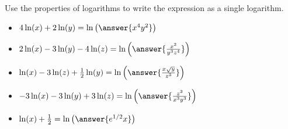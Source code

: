 \documentclass{ximera}
\author{Carl Stitz \and Jeff Zeager \and Bart Snapp \and Matthew Carr}
\begin{document}
\begin{exercise}
Use the properties of logarithms to write the expression as a single
logarithm. 

\begin{itemize}
\item $4\ln(x) + 2\ln(y)=\ln\left(\answer{x^4y^2}\right)$ 
\item $2 \ln(x) -3 \ln(y) - 4\ln(z)=\ln\left(\answer{\frac{x^2}{y^3z^4}}\right)$
\item $\ln(x) - 3 \ln(z) + \frac{1}{2} \ln(y)=\ln\left(\answer{\frac{x\sqrt{y}}{z^{3}}}\right)$
\item $-3\ln(x) -3\ln(y) + 3 \ln(z)=\ln\left(\answer{\frac{z^{3}}{x^{3} y^{3}}}\right)$
\item $\ln(x) + \frac{1}{2}=\ln\left(\answer{e^{1/2}x}\right)$
\end{itemize}

\end{exercise}
\end{document}
